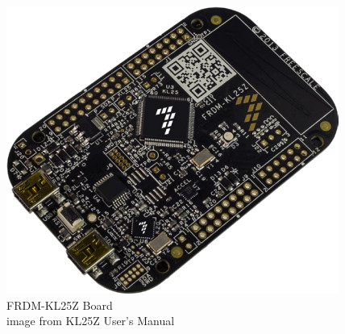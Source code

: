 \documentclass{beamer}
\begin{document}
\begin{frame}
\begin{columns}[t]
\begin{figure}
\centering
\includegraphics[width=1.0\columnwidth]{images-dis1/kl25z} \\
FRDM-KL25Z Board \\
{\tiny image from KL25Z User's Manual}
\end{figure}
\end{columns}
\end{frame}

\end{document}
